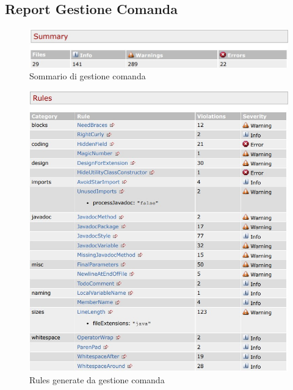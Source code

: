 \newpage

\subsection{Report Gestione Comanda}

\begin{figure}[htbp]
	\centering
	\includegraphics[scale=0.6]{iterazione1/images/Cs_Summary_Gestione_Comanda.jpg}
	\caption{Sommario di gestione comanda\label{fig:Cs_Summary_Gestione_Comanda}}
\end{figure}

\begin{figure}[htbp]
	\centering
	\includegraphics[scale=0.8]{iterazione1/images/Cs_rules_Gestione_Comanda.jpg}
	\caption{Rules generate da gestione comanda\label{fig:Cs_Rules_Gestione_Comanda}}
\end{figure}

